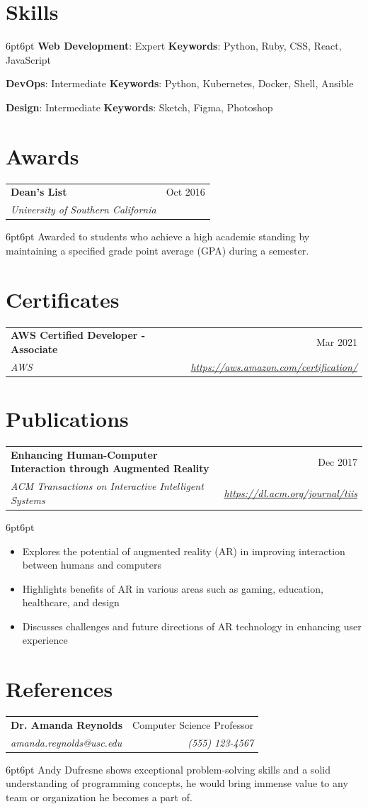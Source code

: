 \documentclass[a4paper,10pt]{article}
\makeatletter
\newcommand{\resumeSubheading}[4]{
  \begin{tabular*}{\textwidth}[t]{l@{\extracolsep{\fill}}r}
    \textbf{#1} & #2 \\
    \textit{#3} & \textit{#4} \\
  \end{tabular*}
}
\makeatother
\begin{document}
\section{Skills}
\begin{adjustwidth}{6pt}{6pt}
\textbf{Web Development}: Expert \hfill \textbf{Keywords}: Python, Ruby, CSS, React, JavaScript

\textbf{DevOps}: Intermediate \hfill \textbf{Keywords}: Python, Kubernetes, Docker, Shell, Ansible

\textbf{Design}: Intermediate \hfill \textbf{Keywords}: Sketch, Figma, Photoshop
\end{adjustwidth}
\section{Awards}
\resumeSubheading
{Dean's List}{Oct 2016}
{University of Southern California}{}
\begin{adjustwidth}{6pt}{6pt}
Awarded to students who achieve a high academic standing by maintaining
a specified grade point average (GPA) during a semester.
\end{adjustwidth}
\section{Certificates}
\resumeSubheading
{AWS Certified Developer - Associate}{Mar 2021}
{AWS}{\url{https://aws.amazon.com/certification/}}
\section{Publications}
\resumeSubheading
{Enhancing Human-Computer Interaction through Augmented Reality}{Dec 2017}
{ACM Transactions on Interactive Intelligent Systems}{\url{https://dl.acm.org/journal/tiis}}
\begin{adjustwidth}{6pt}{6pt}
\begin{itemize}
\item Explores the potential of augmented reality (AR) in improving interaction between humans and computers
\item Highlights benefits of AR in various areas such as gaming, education, healthcare, and design
\item Discusses challenges and future directions of AR technology in enhancing user experience
\end{itemize}
\end{adjustwidth}
\section{References}
\resumeSubheading
{Dr. Amanda Reynolds}{Computer Science Professor}
{amanda.reynolds@usc.edu}{(555) 123-4567}
\begin{adjustwidth}{6pt}{6pt}
Andy Dufresne shows exceptional problem-solving skills and a solid
understanding of programming concepts, he would bring immense value to
any team or organization he becomes a part of.
\end{adjustwidth}
\end{document}
